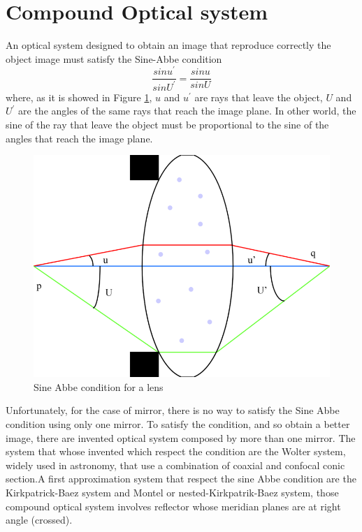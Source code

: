 \section{Compound Optical system}
An optical system designed to obtain an image that reproduce correctly the object image must satisfy the Sine-Abbe condition
\begin{equation}
\frac{sin u^{'}}{sin U^{'}} = \frac{sin u}{ sin U}
\label{eq: SineAbbe}
\end{equation} 
\noindent where, as it is showed in Figure \ref{fig: SineAbbe}, $u $ and $u^{'} $ are rays that leave the object, $U$ and $U^{'} $ are the angles of the same rays that reach the image plane. In other world, the sine of the ray that leave the object must be proportional to the sine of the angles that reach the image plane.
\begin{figure}[]
%
\centering
%
\includegraphics[width=.6\textwidth]{Immagini/Chapter2/SineAbbeCondition}
%
\caption{Sine Abbe condition for a lens}
%
\label{fig: SineAbbe}
%
\end{figure}
Unfortunately, for the case of mirror, there is no way to satisfy the Sine Abbe condition using only one mirror. To satisfy the condition, and so obtain a better image, there are invented optical system composed by more than one mirror. The system that whose invented which respect the condition are the Wolter system, widely used in astronomy, that use a combination of coaxial and confocal conic section.A first approximation system that respect the sine Abbe condition are the Kirkpatrick-Baez system and Montel or nested-Kirkpatrik-Baez system, those compound optical system involves reflector whose meridian planes are at right angle (crossed).
